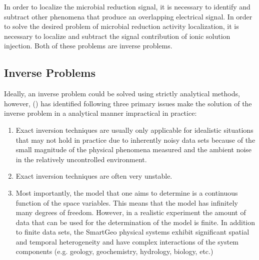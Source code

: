 \documentclass[twocolumn, balance]{article}
\begin{document}
In order to localize the microbial reduction signal, it is necessary to identify and subtract other phenomena that produce an overlapping electrical signal.  In order to solve the desired problem of microbial reduction activity localization, it is necessary to localize and subtract the signal contribution of ionic solution injection.  Both of these problems are inverse problems.

\subsection{Inverse Problems}
Ideally, an inverse problem could be solved using strictly analytical methods, however, (\cite{schnieder1999}) has identified following three primary issues make the solution of the inverse problem in a analytical manner impractical in practice:
\begin{enumerate}
\item Exact inversion techniques are usually only applicable for idealistic situations that may not hold in practice due to inherently noisy data sets because of the small magnitude of the physical phenomena measured and the ambient noise in the relatively uncontrolled environment.
\item Exact inversion techniques are often very unstable. 
\item Most importantly, the model that one aims to determine is a continuous function of the space variables. This means that the model has infinitely many degrees of freedom. However, in a realistic experiment the amount of data that can be used for the determination of the model is  finite.  In addition to finite data sets, the SmartGeo physical systems exhibit significant spatial and temporal heterogeneity and have complex interactions of the system components (e.g. geology, geochemistry, hydrology, biology, etc.)
\end{enumerate}
\end{document}
